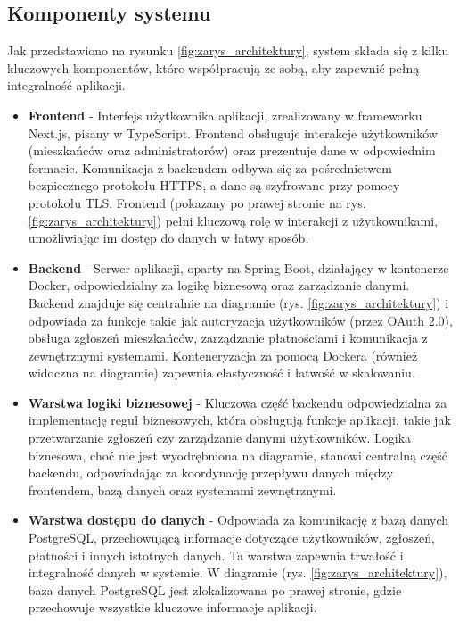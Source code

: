 \subsection{Komponenty systemu}

Jak przedstawiono na rysunku \ref{fig:zarys_architektury}, system składa się z kilku kluczowych komponentów, które współpracują ze sobą, aby zapewnić pełną integralność aplikacji.

\begin{itemize} 

	\item \textbf{Frontend} - Interfejs użytkownika aplikacji, zrealizowany w frameworku Next.js, pisany w TypeScript. Frontend obsługuje interakcje użytkowników (mieszkańców oraz administratorów) oraz prezentuje dane w odpowiednim formacie. Komunikacja z backendem odbywa się za pośrednictwem bezpiecznego protokołu HTTPS, a dane są szyfrowane przy pomocy protokołu TLS. Frontend (pokazany po prawej stronie na rys. \ref{fig:zarys_architektury}) pełni kluczową rolę w interakcji z użytkownikami, umożliwiając im dostęp do danych w łatwy sposób.

	\item \textbf{Backend} - Serwer aplikacji, oparty na Spring Boot, działający w kontenerze Docker, odpowiedzialny za logikę biznesową oraz zarządzanie danymi. Backend znajduje się centralnie na diagramie (rys. \ref{fig:zarys_architektury}) i odpowiada za funkcje takie jak autoryzacja użytkowników (przez OAuth 2.0), obsługa zgłoszeń mieszkańców, zarządzanie płatnościami i komunikacja z zewnętrznymi systemami. Konteneryzacja za pomocą Dockera (również widoczna na diagramie) zapewnia elastyczność i łatwość w skalowaniu.

	\item \textbf{Warstwa logiki biznesowej} - Kluczowa część backendu odpowiedzialna za implementację reguł biznesowych, która obsługują funkcje aplikacji, takie jak przetwarzanie zgłoszeń czy zarządzanie danymi użytkowników. Logika biznesowa, choć nie jest wyodrębniona na diagramie, stanowi centralną część backendu, odpowiadając za koordynację przepływu danych między frontendem, bazą danych oraz systemami zewnętrznymi.

	\item \textbf{Warstwa dostępu do danych} - Odpowiada za komunikację z bazą danych PostgreSQL, przechowującą informacje dotyczące użytkowników, zgłoszeń, płatności i innych istotnych danych. Ta warstwa zapewnia trwałość i integralność danych w systemie. W diagramie (rys. \ref{fig:zarys_architektury}), baza danych PostgreSQL jest zlokalizowana po prawej stronie, gdzie przechowuje wszystkie kluczowe informacje aplikacji.


\end{itemize}
